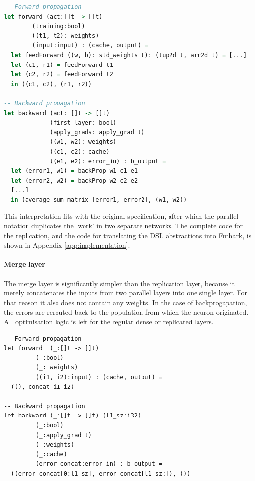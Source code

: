 \begin{lstlisting}[language=Haskell,label={code:bp-replicate},caption={Part
    of the forward and backward propagation algorithms for the replicate layer.
Abbreviated for clarity.}]
-- Forward propagation
let forward (act:[]t -> []t)
	    (training:bool)
	    ((t1, t2): weights)
	    (input:input) : (cache, output) =
  let feedForward ((w, b): std_weights t): (tup2d t, arr2d t) = [...]
  let (c1, r1) = feedForward t1
  let (c2, r2) = feedForward t2
  in ((c1, c2), (r1, r2))

-- Backward propagation
let backward (act: []t -> []t)
             (first_layer: bool)
             (apply_grads: apply_grad t)
             ((w1, w2): weights)
             ((c1, c2): cache)
             ((e1, e2): error_in) : b_output =
  let (error1, w1) = backProp w1 c1 e1
  let (error2, w2) = backProp w2 c2 e2
  [...]
  in (average_sum_matrix [error1, error2], (w1, w2))
\end{lstlisting}

This interpretation fits with the original specification, after which
the parallel notation duplicates the 'work' in two separate networks.
The complete code for the replication, and the code for translating the \gls{DSL}
abstractions into Futhark, is shown in Appendix 
\ref{app:implementation}.

\paragraph{Merge layer}
The merge layer is significantly simpler than the replication layer,
because it merely concatenates the inputs from two parallel layers into one single
layer. 
For that reason it also does not contain any weights.
In the case of backprogapation, the errors are rerouted back to
the population from which the neuron originated.
All optimisation logic is left for the regular dense or replicated
layers.

\begin{lstlisting}[caption={Functions for forward and backward propagation in
the merge layer.}]
-- Forward propagation
let forward  (_:[]t -> []t)
	     (_:bool)
	     (_: weights)
	     ((i1, i2):input) : (cache, output) =
  ((), concat i1 i2)

-- Backward propagation
let backward (_:[]t -> []t) (l1_sz:i32)
	     (_:bool)
	     (_:apply_grad t)
	     (_:weights)
	     (_:cache)
	     (error_concat:error_in) : b_output =
  ((error_concat[0:l1_sz], error_concat[l1_sz:]), ())
\end{lstlisting}

